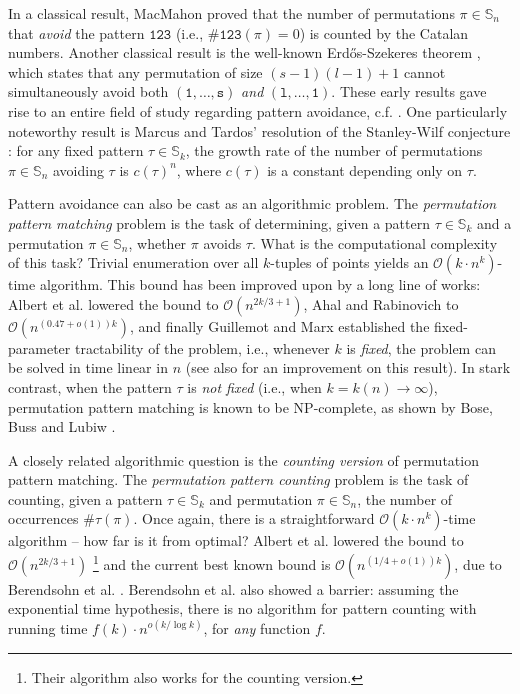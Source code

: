 \documentclass{article}
\newcommand{\Sn}{\mathbb{S}_n}
\newcommand{\pc}[2]{{\# \mathtt{ #1 } \left( #2 \right)}}
\theoremstyle{remark}
\theoremstyle{plain}
\begin{document}
In a classical result, MacMahon \cite{macmahon1915combinatory} proved that the number of permutations $\pi \in \Sn$
that \textit{avoid} the pattern $\mathtt{123}$ (i.e., $\pc{\mathtt{123}}{\pi} = 0$) is counted by the
Catalan numbers. Another classical result is the well-known Erd\H{o}s-Szekeres theorem \cite{erdos1935combinatorial},
which states that any permutation of size $(s-1)(l-1) + 1$
cannot simultaneously avoid both $(\mathtt{1, \dots , s})$ \textit{and} $(\mathtt{l, \dots , 1})$.
These early results gave rise to an entire field of study regarding pattern avoidance,
c.f. \cite{pratt1973computing, knuth1997art, simion1985restricted}.
One particularly noteworthy result is Marcus and Tardos'
resolution of the Stanley-Wilf conjecture \cite{marcus2004excluded}:
for any fixed pattern $\tau \in \mathbb{S}_k$, the growth rate of the number of permutations
$\pi \in \mathbb{S}_n$ avoiding $\tau$ is $c(\tau)^n$, where $c(\tau)$ is a constant depending only on $\tau$.

Pattern avoidance can also be cast as an algorithmic problem.
The \textit{permutation pattern matching} problem is the task
of determining, given a pattern $\tau \in \mathbb{S}_k$ and a permutation $\pi \in \Sn$,
whether $\pi$ avoids $\tau$.
What is the computational complexity of this task? 
Trivial enumeration over all $k$-tuples of points yields an $\mathcal{O}(k \cdot n^k)$-time algorithm.
This bound has been improved upon by a long line of works:
Albert et al. \cite{albert2001algorithms} lowered the bound to $\mathcal{O}(n^{2k/3 + 1})$,
Ahal and Rabinovich \cite{ahal2008complexity} to $\mathcal{O}(n^{(0.47 + o(1))k})$,
and finally Guillemot and Marx \cite{guillemot2014finding} established the fixed-parameter tractability
of the problem, i.e., whenever $k$ is \textit{fixed},
the problem can be solved in time linear in $n$
(see also \cite{fox2013stanley} for an improvement on this result).
In stark contrast, when the pattern $\tau$ is \textit{not fixed} (i.e., when $k=k(n)\to \infty$),
permutation pattern matching is known to be NP-complete, as shown
by Bose, Buss and Lubiw \cite{bose1998pattern}.

A closely related algorithmic question is the \textit{counting version} of permutation pattern matching.
The \textit{permutation pattern counting} problem is the task of counting,
given a pattern $\tau \in \mathbb{S}_k$ and permutation $\pi \in \mathbb{S}_n$,
the number of occurrences $\pc{\tau}{\pi}$. Once again, there is a straightforward $\mathcal{O}(k \cdot n^k)$-time algorithm
-- how far is it from optimal?
Albert et al. lowered the bound to $\mathcal{O}(n^{2k/3 + 1})$ \cite{albert2001algorithms}\footnote{
Their algorithm also works for the counting version.
}
and the current best known bound is $\mathcal{O}(n^{(1/4 + o(1))k})$, due to Berendsohn et al. \cite{berendsohn2021finding}. 
Berendsohn et al. also showed a barrier: assuming the exponential time hypothesis,
there is no algorithm for pattern counting with running time $f(k) \cdot n^{o(k/\log k)}$,
for \textit{any} function $f$.
\end{document}
